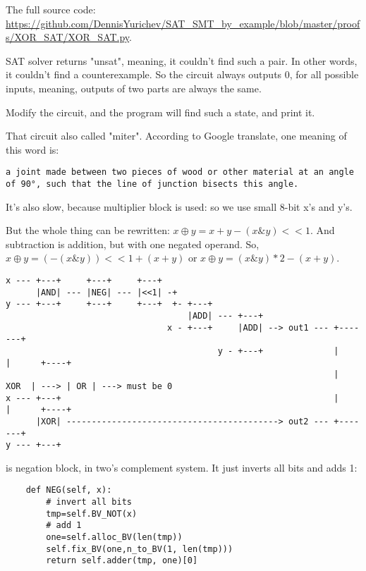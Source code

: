 The full source code: \url{https://github.com/DennisYurichev/SAT_SMT_by_example/blob/master/proofs/XOR_SAT/XOR_SAT.py}.

SAT solver returns "unsat", meaning, it couldn't find such a pair.
In other words, it couldn't find a counterexample.
So the circuit always outputs 0, for all possible inputs, meaning, outputs of two parts are always the same.

Modify the circuit, and the program will find such a state, and print it.

That circuit also called "miter".
According to Google translate, one meaning of this word is:

\begin{lstlisting}
a joint made between two pieces of wood or other material at an angle of 90°, such that the line of junction bisects this angle.
\end{lstlisting}

It's also slow, because multiplier block is used: so we use small 8-bit x's and y's.

But the whole thing can be rewritten: $x \oplus y = x+y - (x \& y)<<1$.
And subtraction is addition, but with one negated operand.
So, $x \oplus y = (-(x \& y))<<1 + (x + y)$ or
$x \oplus y = (x \& y)*2 - (x + y)$.

\begin{lstlisting}[basicstyle=\footnotesize]
x --- +---+     +---+     +---+
      |AND| --- |NEG| --- |<<1| -+ 
y --- +---+     +---+     +---+  +- +---+
                                    |ADD| --- +---+
                                x - +---+     |ADD| --> out1 --- +-------+
                                          y - +---+              |       |      +----+
                                                                 |  XOR  | ---> | OR | ---> must be 0
x --- +---+                                                      |       |      +----+
      |XOR| ------------------------------------------> out2 --- +-------+
y --- +---+
\end{lstlisting}

 is negation block, in two's complement system.
It just inverts all bits and adds 1:

\begin{lstlisting}
    def NEG(self, x):
        # invert all bits
        tmp=self.BV_NOT(x)
        # add 1
        one=self.alloc_BV(len(tmp))
        self.fix_BV(one,n_to_BV(1, len(tmp)))
        return self.adder(tmp, one)[0]
\end{lstlisting}

